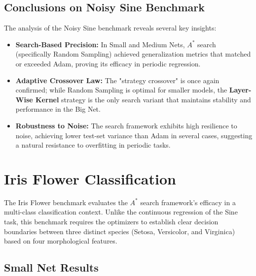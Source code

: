 \subsection{Conclusions on Noisy Sine Benchmark}

The analysis of the Noisy Sine benchmark reveals several key insights:

\begin{itemize}
    \item \textbf{Search-Based Precision:} In Small and Medium Nets, $A^*$ search (specifically Random Sampling) achieved generalization metrics that matched or exceeded Adam, proving its efficacy in periodic regression.
    \item \textbf{Adaptive Crossover Law:} The "strategy crossover" is once again confirmed; while Random Sampling is optimal for smaller models, the \textbf{Layer-Wise Kernel} strategy is the only search variant that maintains stability and performance in the Big Net.
    \item \textbf{Robustness to Noise:} The search framework exhibits high resilience to noise, achieving lower test-set variance than Adam in several cases, suggesting a natural resistance to overfitting in periodic tasks.
\end{itemize}



\newpage

\section{Iris Flower Classification}
\label{sec:results_iris}

The Iris Flower benchmark evaluates the $A^*$ search framework's efficacy in a multi-class classification context. Unlike the continuous regression of the Sine task, this benchmark requires the optimizers to establish clear decision boundaries between three distinct species (Setosa, Versicolor, and Virginica) based on four morphological features.

\subsection{Small Net Results}

